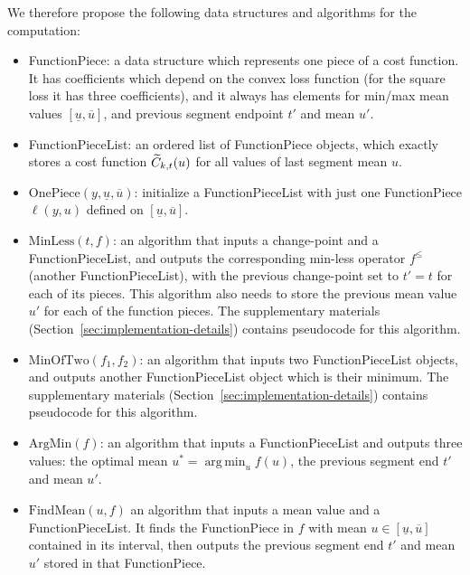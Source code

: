 \documentclass{article}
\DeclareMathOperator*{\argmin}{arg\,min}
\begin{document}
We therefore propose the following data structures and algorithms for
the computation:
\begin{itemize}
\item FunctionPiece: a data structure which represents one piece of a
  cost function. It has coefficients which depend on the convex loss
  function (for the square loss it has three coefficients), and it
  always has elements for min/max mean values
  $[\underline u, \overline u]$, and previous segment endpoint $t'$
  and mean $u'$.
\item FunctionPieceList: an ordered list of FunctionPiece objects,
  which exactly stores a cost function $\widetilde{C}_{k,t}(u)$ for all values
  of last segment mean $u$.
\item $\text{OnePiece}(y, \underline u, \overline u)$: initialize a
  FunctionPieceList with just one FunctionPiece $\ell(y, u)$ defined
  on $[\underline u, \overline u]$.
\item $\text{MinLess}(t, f)$: an algorithm that inputs a change-point
  and a FunctionPieceList, and outputs the corresponding min-less
  operator $f^\leq$ (another FunctionPieceList), with the previous
  change-point set to $t'=t$ for each of its pieces. This algorithm
  also needs to store the previous mean value $u'$ for each of the
  function pieces. The supplementary materials
  (Section~\ref{sec:implementation-details}) contains
  pseudocode for this algorithm.
\item $\text{MinOfTwo} (f_1, f_2)$: an algorithm that inputs two
  FunctionPieceList objects, and outputs another FunctionPieceList
  object which is their minimum. The supplementary materials
  (Section~\ref{sec:implementation-details}) contains
  pseudocode for this algorithm.
\item $\text{ArgMin}(f)$: an algorithm that inputs a FunctionPieceList
  and outputs three values: the optimal mean $u^*=\argmin_u f(u)$, the
  previous segment end $t'$ and mean $u'$.
\item $\text{FindMean}(u, f)$ an algorithm that inputs a mean value
  and a FunctionPieceList. It finds the FunctionPiece in $f$ with mean
  $u\in[\underline u, \overline u]$ contained in its interval, then
  outputs the previous segment end $t'$ and mean $u'$ stored in that
  FunctionPiece.
\end{itemize}
\end{document}
